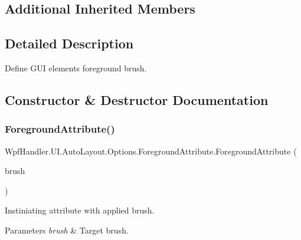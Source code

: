 \subsection*{Additional Inherited Members}


\subsection{Detailed Description}
Define G\+UI element\textquotesingle{}s foreground brush. 



\subsection{Constructor \& Destructor Documentation}
\mbox{\label{class_wpf_handler_1_1_u_i_1_1_auto_layout_1_1_options_1_1_foreground_attribute_abae0ce13aea7130e5e9c72c208443380}} 
\subsubsection{\texorpdfstring{Foreground\+Attribute()}{ForegroundAttribute()}\hspace{0.1cm}{\footnotesize\ttfamily [1/4]}}
{\footnotesize\ttfamily Wpf\+Handler.\+U\+I.\+Auto\+Layout.\+Options.\+Foreground\+Attribute.\+Foreground\+Attribute (\begin{DoxyParamCaption}\item[{\mbox{\hyperlink{class_wpf_handler_1_1_u_i_1_1_color_attribute_afa14c4542d8023b3ddad6aba74993877}{Brush}}}]{brush }\end{DoxyParamCaption})}



Instiniating attribute with applied brush. 


\begin{DoxyParams}{Parameters}
{\em brush} & Target brush.\\
\hline
\end{DoxyParams}


